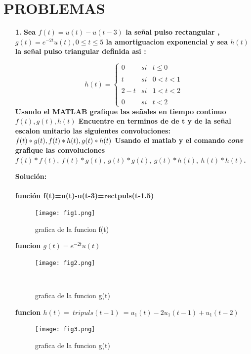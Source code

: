 \documentclass[11pt,a4paper]{article}
\begin{document}
	\section{PROBLEMAS}{
	\large{
	\begin{enumerate}
	\item[\textbf{1.}]
\textbf{Sea $f(t)=u(t)-u(t-3)$ la señal pulso rectangular , $g(t)= e^{-2t}u(t) , 0\leq t\leq 5$ la  amortiguacion exponencial y sea $h(t)$ la señal  pulso triangular definida asi :}

\[h(t)=\left\{ \begin{array}{lccc}
             0 &   si  & t \leq 0 \\
             \\ t &  si & 0 < t < 1 \\
             \\ 2-t &  si  & 1 < t < 2\\
             \\  0 & si &  t < 2
             \end{array}
   \right.
\]
\textbf{Usando el MATLAB grafique las señales  en tiempo continuo $f(t) , g(t) , h(t)$\newline
Encuentre en terminos de  de t y de la señal escalon  unitario  las siguientes convoluciones: $f(t)*g(t) ,f(t)*h(t) ,g(t)*h(t)\newline  $
Usando el matlab y el comando \textit{conv} grafique las convoluciones $f(t)*f(t),\ f(t)*g(t), \ g(t)*g(t),\ g(t)*h(t),\ h(t)*h(t)$.}\newline

\textbf{Solución:}\\\\
\textbf{función f(t)=u(t)-u(t-3)=rectpuls(t-1.5)}
\begin{figure}[h]
    \centering
    \texttt{[image: fig1.png]}
    \caption{grafica de la funcion f(t)}
    \label{fig:my_label}
\end{figure}

\newpage


\textbf{funcion $g(t)=e^{-2t}u(t)$}
\begin{figure}[h]
    \centering
    \texttt{[image: fig2.png]}
    \caption{grafica de la funcion g(t)}
    \
\end{figure}



\textbf{funcion $h(t)= \ tripuls(t-1) \ = u_1(t)-2u_1(t-1)+u_1(t-2) $}
\begin{figure}[H]
    \centering
    \texttt{[image: fig3.png]}
    \caption{grafica de la funcion g(t)}
\end{figure}
\newpage




\end{enumerate}}}
\end{document}
